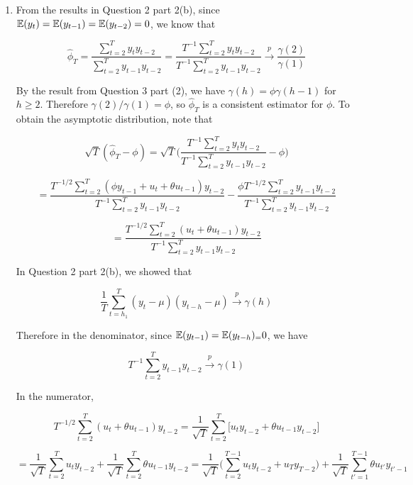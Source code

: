 \begin{enumerate}[(1)]

\item From the results in Question 2 part 2(b), since \(\mathbb{E}(y_t) = \mathbb{E}(y_{t-1}) = \mathbb{E}(y_{t-2}) = 0\), we know that

\[
\hat{\phi}_T = \frac{\sum_{t=2}^T y_t y_{t-2}}{\sum_{t=2}^T y_{t-1} y_{t-2}} = \frac{T^{-1}\sum_{t=2}^T y_t y_{t-2}}{T^{-1}\sum_{t=2}^T y_{t-1} y_{t-2}} \xrightarrow{p} \frac{\gamma(2)}{\gamma(1)} 
\]

By the result from Question 3 part (2), we have \(\gamma(h) = \phi \gamma(h-1)\) for \(h \geq 2\). Therefore \(\gamma(2)/\gamma(1) = \phi\), so \(\hat{\phi}_T\) is a consistent estimator for \(\phi\). To obtain the asymptotic distribution, note that


\[
\sqrt{T}(\hat{\phi}_T - \phi) = \sqrt{T} \bigg(\frac{T^{-1}\sum_{t=2}^T y_t y_{t-2}}{T^{-1}\sum_{t=2}^T y_{t-1} y_{t-2}}  - \phi \bigg) 
\]

\[
= \frac{T^{-1/2}\sum_{t=2}^T (\phi y_{t-1} + u_t + \theta u_{t-1}) y_{t-2}}{T^{-1}\sum_{t=2}^T y_{t-1}y_{t-2}} -  \frac{\phi T^{-1/2}\sum_{t=2}^T y_{t-1} y_{t-2}}{T^{-1}\sum_{t=2}^T y_{t-1} y_{t-2}}
\]

\[
= \frac{T^{-1/2}\sum_{t=2}^T (u_t + \theta u_{t-1}) y_{t-2}}{T^{-1}\sum_{t=2}^T y_{t-1}y_{t-2}} 
\]

In Question 2 part 2(b), we showed that 

\[
\frac{1}{T}\sum_{t=h_1}^T (y_t - \mu)(y_{t-h} - \mu) \xrightarrow{p} \gamma(h)
\]

Therefore in the denominator, since \(\mathbb{E}(y_{t-1}) = \mathbb{E}(y_{t-h} )_= 0\), we have

\[
T^{-1}\sum_{t=2}^T y_{t-1}y_{t-2} \xrightarrow{p} \gamma(1)
\]

In the numerator, 

\[
T^{-1/2}\sum_{t=2}^T (u_t + \theta u_{t-1}) y_{t-2} = \frac{1}{\sqrt{T}}\sum_{t=2}^T \big[u_t y_{t-2} + \theta u_{t-1} y_{t-2} \big] 
\]

\[
= \frac{1}{\sqrt{T}}\sum_{t=2}^T u_t y_{t-2} +  \frac{1}{\sqrt{T}}\sum_{t=2}^T  \theta  u_{t-1} y_{t-2}  = \frac{1}{\sqrt{T}}\bigg(\sum_{t=2}^{T-1} u_t y_{t-2} + u_T y_{T-2} \bigg) +  \frac{1}{\sqrt{T}}\sum_{t'=1}^{T-1}  \theta  u_{t'} y_{t'-1} 
\]


\end{enumerate}
